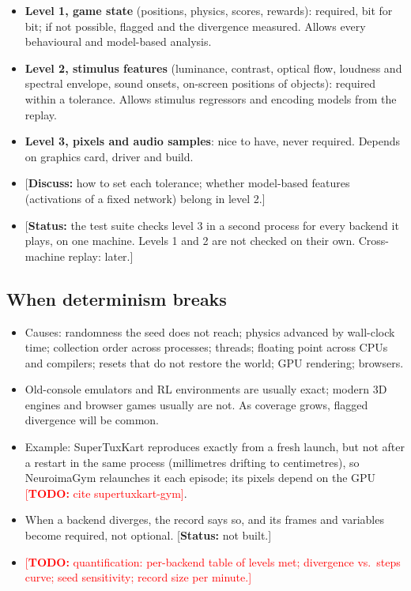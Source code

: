 \documentclass{article}
\newcommand{\TODO}[1]{\textcolor{red}{[\textbf{TODO:} #1]}}
\newcommand{\status}[1]{\textcolor{teal!70!black}{[\textbf{Status:} #1]}}
\newcommand{\question}[1]{\textcolor{blue!70!black}{[\textbf{Discuss:} #1]}}
\begin{document}
\begin{itemize}
  \item \textbf{Level 1, game state} (positions, physics, scores, rewards): required, bit for bit; if not possible, flagged and the divergence measured. Allows every behavioural and model-based analysis.
  \item \textbf{Level 2, stimulus features} (luminance, contrast, optical flow, loudness and spectral envelope, sound onsets, on-screen positions of objects): required within a tolerance. Allows stimulus regressors and encoding models from the replay.
  \item \textbf{Level 3, pixels and audio samples}: nice to have, never required. Depends on graphics card, driver and build.
  \item \question{how to set each tolerance; whether model-based features (activations of a fixed network) belong in level 2.}
  \item \status{the test suite checks level 3 in a second process for every backend it plays, on one machine. Levels 1 and 2 are not checked on their own. Cross-machine replay: later.}
\end{itemize}

\subsection{When determinism breaks}

\begin{itemize}
  \item Causes: randomness the seed does not reach; physics advanced by wall-clock time; collection order across processes; threads; floating point across CPUs and compilers; resets that do not restore the world; GPU rendering; browsers.
  \item Old-console emulators and RL environments are usually exact; modern 3D engines and browser games usually are not. As coverage grows, flagged divergence will be common.
  \item Example: SuperTuxKart reproduces exactly from a fresh launch, but not after a restart in the same process (millimetres drifting to centimetres), so NeuroimaGym relaunches it each episode; its pixels depend on the GPU \TODO{cite supertuxkart-gym}.
  \item When a backend diverges, the record says so, and its frames and variables become required, not optional. \status{not built.}
  \item \TODO{quantification: per-backend table of levels met; divergence vs.\ steps curve; seed sensitivity; record size per minute.}
\end{itemize}
\end{document}
